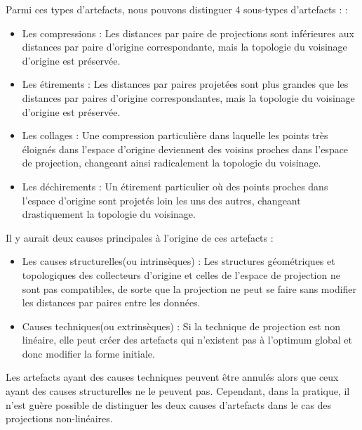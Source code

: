 Parmi ces types d'artefacts, nous pouvons distinguer 4 sous-types d'artefacts :\cite{aupetit2007visualizing} :

\begin{itemize}
    \item Les compressions : Les distances par paire de projections sont inférieures aux distances par paire d'origine correspondante, mais la topologie du voisinage d'origine est préservée.
    \item Les étirements : Les distances par paires projetées sont plus grandes que les distances par paires d'origine correspondantes, mais la topologie du voisinage d'origine est préservée.
    \item Les collages :  Une compression particulière dans laquelle les points très éloignés dans l'espace d'origine deviennent des voisins proches dans l'espace de projection, changeant ainsi radicalement la topologie du voisinage.
    \item Les déchirements : Un étirement particulier où des points proches dans l'espace d'origine sont projetés loin les uns des autres, changeant drastiquement la topologie du voisinage.
\end{itemize}

Il y aurait deux causes principales à l'origine de ces artefacts \cite{aupetit2007visualizing} : 
\begin{itemize}
    \item Les causes structurelles(ou intrinsèques) : Les structures géométriques et topologiques des collecteurs d'origine et celles de l'espace de projection ne sont pas compatibles, de sorte que la projection ne peut se faire sans modifier les distances par paires entre les données.
    \item Causes techniques(ou extrinsèques)  : Si la technique de projection est non linéaire, elle peut créer des artefacts qui n'existent pas à l'optimum global et donc modifier la forme initiale.
\end{itemize}

Les artefacts ayant des causes techniques peuvent être annulés alors que ceux ayant des causes structurelles ne le peuvent pas. Cependant, dans la pratique, il n'est guère possible de distinguer les deux causes d'artefacts dans le cas des projections non-linéaires.


